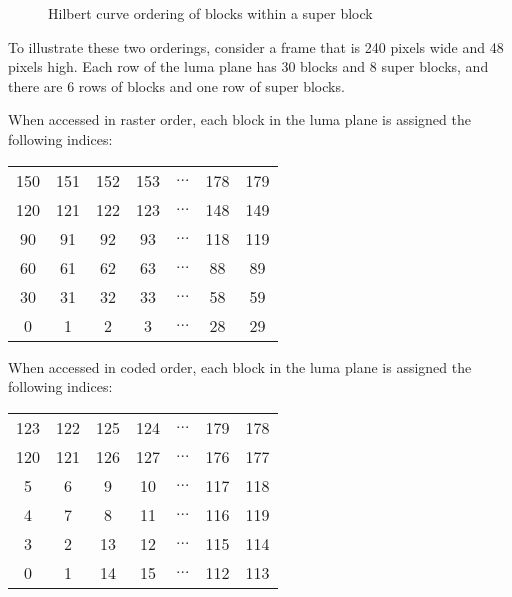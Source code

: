 \documentclass[11pt,letterpaper]{article}
\begin{document}
\begin{figure}[htb]
\begin{center}

\end{center}
\caption{Hilbert curve ordering of blocks within a super block}
\label{fig:hilbert-block}
\end{figure}

To illustrate these two orderings, consider a frame that is 240 pixels wide and
 48 pixels high.
Each row of the luma plane has 30 blocks and 8 super blocks, and there are 6
 rows of blocks and one row of super blocks.

When accessed in raster order, each block in the luma plane is assigned the
 following indices:

\vspace{\baselineskip}
\begin{center}
\begin{tabular}{|cccc|c|cc|}\hline
150 & 151 & 152 & 153 & $\ldots$ & 178 & 179 \\
120 & 121 & 122 & 123 & $\ldots$ & 148 & 149 \\\hline
 90 &  91 &  92 &  93 & $\ldots$ & 118 & 119 \\
 60 &  61 &  62 &  63 & $\ldots$ &  88 &  89 \\
 30 &  31 &  32 &  33 & $\ldots$ &  58 &  59 \\
  0 &   1 &   2 &   3 & $\ldots$ &  28 &  29 \\\hline
\end{tabular}
\end{center}
\vspace{\baselineskip}

When accessed in coded order, each block in the luma plane is assigned the
 following indices:

\vspace{\baselineskip}
\begin{center}
\begin{tabular}{|cccc|c|cc|}\hline
123 & 122 & 125 & 124 & $\ldots$ & 179 & 178 \\
120 & 121 & 126 & 127 & $\ldots$ & 176 & 177 \\\hline
  5 &   6 &   9 &  10 & $\ldots$ & 117 & 118 \\
  4 &   7 &   8 &  11 & $\ldots$ & 116 & 119 \\
  3 &   2 &  13 &  12 & $\ldots$ & 115 & 114 \\
  0 &   1 &  14 &  15 & $\ldots$ & 112 & 113 \\\hline
\end{tabular}
\end{center}
\vspace{\baselineskip}
\end{document}

